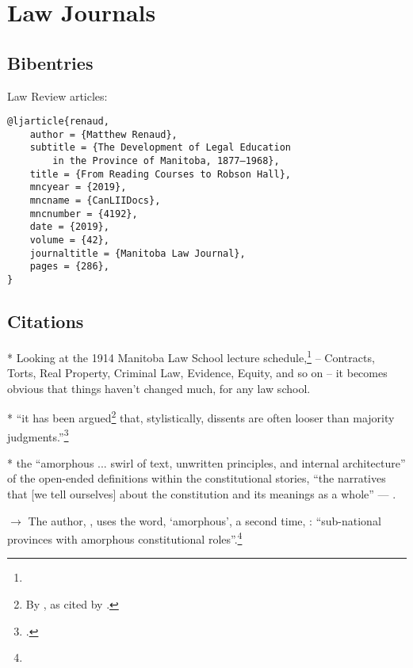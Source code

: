 \section{Law Journals}
\subsection{Bibentries}

Law Review articles: \par\bigskip
\begin{verbatim}
@ljarticle{renaud,
	author = {Matthew Renaud},
	subtitle = {The Development of Legal Education 
		in the Province of Manitoba, 1877–1968},
	title = {From Reading Courses to Robson Hall},
	mncyear = {2019},
	mncname = {CanLIIDocs},
	mncnumber = {4192},
	date = {2019},
	volume = {42},
	journaltitle = {Manitoba Law Journal},
	pages = {286},
}
\end{verbatim}

\subsection{Citations}


* Looking at the 1914 Manitoba Law School lecture schedule,\footnote{} -- Contracts, Torts, Real Property, Criminal Law, Evidence, Equity, and so on -- it becomes obvious that things haven't changed much, for any law school.

* ``it has been argued\footnote{By , as cited by .} that, stylistically,
dissents are often looser than majority judgments.''\footnote{.}\bigskip 


* the ``amorphous ... swirl of text,
unwritten principles, and internal architecture'' of the open-ended definitions within the constitutional stories, ``the narratives that [we tell ourselves] about the
constitution and its meanings as a whole''
 --- .\bigskip


$\rightarrow$ The author, , uses the word, `amorphous', a second time, : ``sub-national provinces with
amorphous constitutional roles''.\footnote{}

